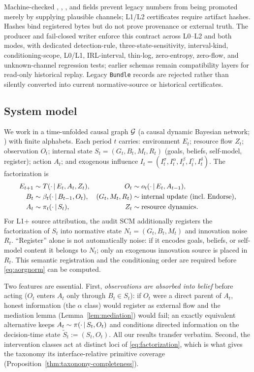 Machine-checked , ,
, and  fields prevent legacy
numbers from being promoted merely by supplying plausible channels; L1/L2
certificates require artifact hashes. Hashes bind registered bytes but do not
prove provenance or external truth. The producer
 and fail-closed writer
 enforce this contract across L0--L2 and both
modes, with dedicated detection-rule, three-state-sensitivity, interval-kind,
conditioning-scope, L0/L1, IRL-interval, thin-log, zero-entropy, zero-flow, and
unknown-channel regression tests; earlier schemas remain compatibility layers
for read-only historical replay. Legacy \texttt{Bundle} records are rejected
rather than silently converted into current normative-source or historical
certificates.

\subsection{System model}\label{sec:model}

We work in a time-unfolded causal graph $\mathcal{G}$ (a causal dynamic Bayesian
network; \citealp{peters2017}) with finite alphabets. Each period $t$ carries:
environment $E_t$; resource flow $Z_t$; observation $O_t$; internal state
$S_t=(G_t,B_t,M_t,R_t)$ (goals, beliefs, self-model, register); action $A_t$;
and exogenous influence $I_t=(I_t^\sigma,I_t^\alpha,I_t^\beta,I_t^\gamma,I_t^\delta)$.
The factorization is
\begin{align}
E_{t+1} &\sim T(\cdot\,|\, E_t,A_t,Z_t), &
O_t &\sim o_t(\cdot\,|\, E_t,A_{t-1}), \notag\\
B_t &\sim \beta_t(\cdot\,|\, B_{t-1},O_t), &
(G_t,M_t,R_t) &\sim \text{internal update (incl.\ $\mathrm{Endorse}$)}, \notag\\
A_t &\sim \pi_t(\cdot\,|\, S_t), &
Z_t &\sim \text{resource dynamics}.
\label{eq:factorization}
\end{align}
For L1+ source attribution, the audit SCM additionally registers the
factorization of $S_t$ into normative state $N_t=(G_t,B_t,M_t)$ and innovation
noise $R_t$. ``Register'' alone is not automatically noise: if it encodes goals,
beliefs, or self-model content it belongs to $N_t$; only an exogenous
innovation source is placed in $R_t$. This semantic registration and the
conditioning order are required before \eqref{eq:aorgnorm} can be computed.

Two features are essential. First, \emph{observations are absorbed into belief}
before acting ($O_t$ enters $A_t$ only through $B_t\in S_t$): if $O_t$ were a
direct parent of $A_t$, honest information (the $\alpha$ class) would register
as external flow and the mediation lemma (Lemma~\ref{lem:mediation}) would
fail; an exactly equivalent alternative keeps $A_t\sim\pi(\cdot\,|\, S_t,O_t)$
and conditions directed information on the decision-time state
$\tilde S_t:=(S_t,O_t)$. All our results transfer verbatim. Second, the
intervention classes act at distinct loci of \eqref{eq:factorization}, which is
what gives the taxonomy its interface-relative primitive coverage
(Proposition~\ref{thm:taxonomy-completeness}).

